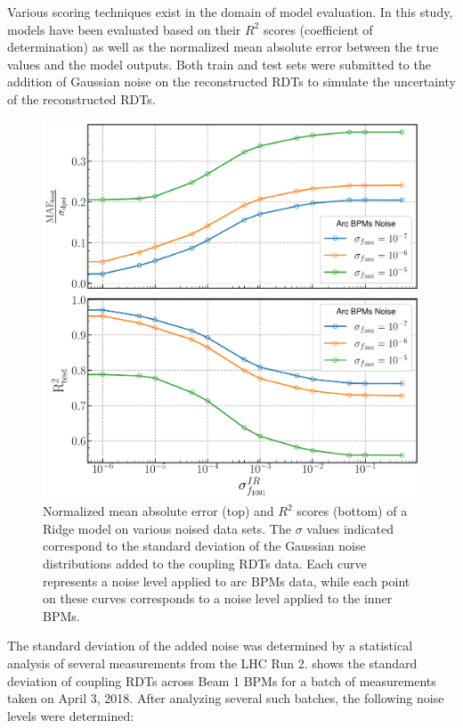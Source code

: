 Various scoring techniques exist in the domain of model evaluation.
In this study, models have been evaluated based on their \(R^2\) scores (coefficient of determination) as well as the normalized mean absolute error between the true values and the model outputs.
Both train and test sets were submitted to the addition of Gaussian noise on the reconstructed RDTs to simulate the uncertainty of the reconstructed RDTs.

\begin{figure}[!htb]
    \centering
    \includegraphics*[width=0.9\columnwidth]{Figures/ML_for_IR_Coupling/ridge_performance.pdf}
    \caption{Normalized mean absolute error (top) and \(R^2\) scores (bottom) of a Ridge model on various noised data sets. The \(\sigma\) values indicated correspond to the standard deviation of the Gaussian noise distributions added to the coupling RDTs data. Each curve represents a noise level applied to arc BPMs data, while each point on these curves corresponds to a noise level applied to the inner BPMs.}
    \label{fig:ridge_performance}
\end{figure}

The standard deviation of the added noise was determined by a statistical analysis of several measurements from the LHC Run 2.
 shows the standard deviation of coupling RDTs across Beam 1 BPMs for a batch of measurements taken on April 3, 2018.
After analyzing several such batches, the following noise levels were determined:

